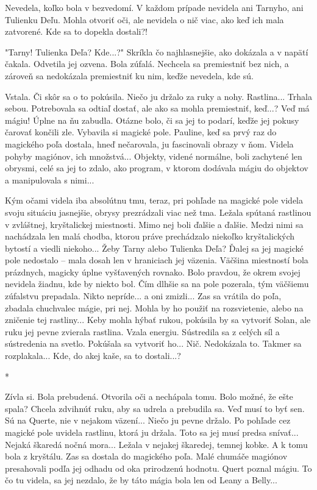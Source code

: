 \documentclass{book}
\begin{document}
Nevedela, koľko bola v bezvedomí. V každom prípade nevidela ani Tarnyho, ani Tulienku Deľu. Mohla otvoriť oči, ale nevidela o nič viac, ako keď ich mala zatvorené. Kde sa to dopekla dostali?!

"$ $Tarny! Tulienka Deľa? Kde...?"$ $ Skríkla čo najhlasnejšie, ako dokázala a v napätí čakala. Odvetila jej ozvena. Bola zúfalá. Nechcela sa premiestniť bez nich, a zároveň sa nedokázala premiestniť ku nim, keďže nevedela, kde sú.

Vstala. Či skôr sa o to pokúsila. Niečo ju držalo za ruky a nohy. Rastlina... Trhala sebou. Potrebovala sa odtiaľ dostať, ale ako sa mohla premiestniť, keď...? Veď má mágiu! Úplne na ňu zabudla. Otázne bolo, či sa jej to podarí, keďže jej pokusy čarovať končili zle. Vybavila si magické pole. Pauline, keď sa prvý raz do magického poľa dostala, hneď nečarovala, ju fascinovali obrazy v ňom. Videla pohyby magiónov, ich množstvá... Objekty, videné normálne, boli zachytené len obrysmi, celé sa jej to zdalo, ako program, v ktorom dodávala mágiu do objektov a manipulovala s nimi...

Kým očami videla iba absolútnu tmu, teraz, pri pohľade na magické pole videla svoju situáciu jasnejšie, obrysy prezrádzali viac než tma. Ležala spútaná rastlinou v zvláštnej, kryštalickej miestnosti. Mimo nej boli ďalšie a ďalšie. Medzi nimi sa nachádzala len malá chodba, ktorou práve prechádzalo niekoľko kryštalických bytostí a viedli niekoho... Žeby Tarny alebo Tulienka Deľa? Ďalej sa jej magické pole nedostalo – mala dosah len v hraniciach jej väzenia. Väčšina miestností bola prázdnych, magicky úplne vyšťavených rovnako. Bolo pravdou, že okrem svojej nevidela žiadnu, kde by niekto bol. Čím dlhšie sa na pole pozerala, tým väčšiemu zúfalstvu prepadala. Nikto nepríde... a oni zmizli... Zas sa vrátila do poľa, zbadala chuchvalec mágie, pri nej. Mohla by ho použiť na rozsvietenie, alebo na zničenie tej rastliny... Keby mohla hýbať rukou, pokúsila by sa vytvoriť Solan, ale ruku jej pevne zvierala rastlina. Vzala energiu. Sústredila sa z celých síl a sústredenia na svetlo. Pokúšala sa vytvoriť ho... Nič. Nedokázala to. Takmer sa rozplakala... Kde, do akej kaše, sa to dostali...?

\begin{center}

*

\end{center}

Zívla si. Bola prebudená. Otvorila oči a nechápala tomu. Bolo možné, že ešte spala? Chcela zdvihnúť ruku, aby sa udrela a prebudila sa. Veď musí to byť sen. Sú na Querte, nie v nejakom väzení... Niečo ju pevne držalo. Po pohľade cez magické pole uvidela rastlinu, ktorá ju držala. Toto sa jej musí predsa snívať... Nejaká škaredá nočná mora... Ležala v nejakej škaredej, temnej kobke. A k tomu bola z kryštálu. Zas sa dostala do magického poľa. Malé chumáče magiónov presahovali podľa jej odhadu od oka prirodzenú hodnotu. Quert poznal mágiu. To čo tu videla, sa jej nezdalo, že by táto mágia bola len od Leany a Belly...
\end{document}
